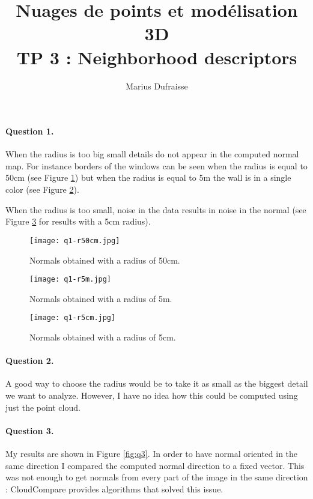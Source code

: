 \documentclass[french]{article}
\begin{document}
\title{Nuages de points et modélisation 3D\\
TP 3 : Neighborhood descriptors}
\author{Marius Dufraisse}
\date{}

\maketitle


\paragraph{Question 1.} When the radius is too big small details do not appear in the computed normal map. For instance borders of the windows can be seen when the radius is equal to 50cm (see Figure \ref{fig:q1-50cm}) but when the radius is equal to 5m the wall is in a single color (see Figure \ref{fig:q1-5m}).

When the radius is too small, noise in the data results in noise in the normal (see Figure \ref{fig:q1-5cm} for results with a 5cm radius).



\begin{figure}[h]
	\centering
	\texttt{[image: q1-r50cm.jpg]}
	\caption{Normals obtained with a radius of 50cm.}
	\label{fig:q1-50cm}
\end{figure}

\begin{figure}[h]
	\centering
	\texttt{[image: q1-r5m.jpg]}
	\caption{Normals obtained with a radius of 5m.}
	\label{fig:q1-5m}
\end{figure}

\begin{figure}[h]
	\centering
	\texttt{[image: q1-r5cm.jpg]}
	\caption{Normals obtained with a radius of 5cm.}
	\label{fig:q1-5cm}
\end{figure}

\paragraph{Question 2.} A good way to choose the radius would be to take it as small as the biggest detail we want to analyze. However, I have no idea how this could be computed using just the point cloud.

\paragraph{Question 3.} My results are shown in Figure \ref{fig:q3}. In order to have normal oriented in the same direction I compared the computed normal direction to a fixed vector. This was not enough to get normals from every part of the image in the same direction : CloudCompare provides algorithms that solved this issue.
\end{document}
